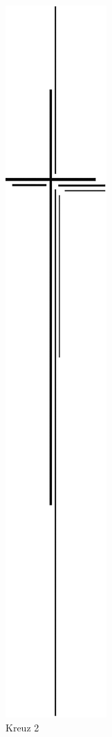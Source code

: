 \documentclass[ngerman,a4paper,11pt]{scrreprt}
\begin{document}
\begin{figure}[H]
\centering
\includegraphics[width=\textwidth,height=.8\textheight]{Bilder/Bilder/750_0010_12728_Kreuz_1.png}
\caption{Kreuz 2}
\end{figure}
\end{document}
